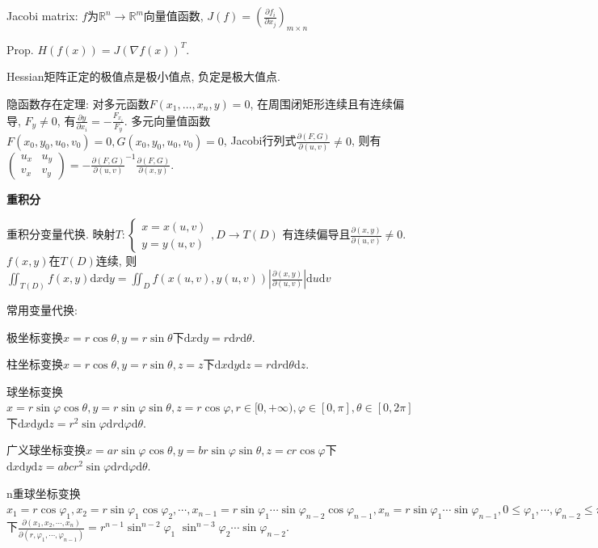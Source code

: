 \documentclass[UTF8]{ctexart}
\begin{document}
Jacobi matrix: $f$为$\mathbb{R}^n\to \mathbb{R}^m$向量值函数,
$J(f)=\left(\frac{\partial f_i}{\partial x_j}\right)_{m\times n}$

Prop. $H(f(x))=J(\nabla f(x))^T$.

Hessian矩阵正定的极值点是极小值点, 负定是极大值点.

隐函数存在定理:
对多元函数$F(x_1,\dots,x_n,y)=0$, 在周围闭矩形连续且有连续偏导, $F_y\neq 0$, 有$\frac{\partial y}{\partial x_i}=-\frac{F_{x_i}}{F_y}$.
多元向量值函数$F(x_0,y_0,u_0,v_0)=0, G(x_0,y_0,u_0,v_0)=0$, Jacobi行列式$\frac{\partial(F,G)}{\partial(u,v)}\neq 0$,
则有$\begin{pmatrix} u_x & u_y \\ v_x  & v_y \end{pmatrix} = -\frac{\partial(F,G)}{\partial(u,v)} ^{-1}\frac{\partial(F,G)}{\partial(x,y)}$.


\noindent \textbf{重积分}

重积分变量代换. 映射$T:
	\left\{\begin{matrix}
		x=x(u,v) \\y=y(u,v)
	\end{matrix}\right.,D\to T(D)$
有连续偏导且$\frac{\partial(x,y)}{\partial(u,v)}\neq 0$.
$f(x,y)$在$T(D)$连续, 则
$\iint_{T(D)}f(x,y)\mathrm{d}x\mathrm{d}y=\iint_{D} f(x(u,v), y(u,v))
	\left|\frac{\partial(x,y)}{\partial(u,v)}\right| \mathrm{d}u\mathrm{d}v$


\noindent 常用变量代换:\par
极坐标变换$x=r\cos\theta,y=r\sin\theta$下$\mathrm{d}x\mathrm{d}y=r\mathrm{d}r\mathrm{d}\theta$.\par
柱坐标变换$x=r\cos\theta,y=r\sin\theta,z=z$下$\mathrm{d}x\mathrm{d}y\mathrm{d}z=r\mathrm{d}r\mathrm{d}\theta\mathrm{d}z$.\par
球坐标变换$x=r\sin\varphi\cos\theta,y=r\sin\varphi\sin\theta,z=r\cos\varphi,
	r\in[0,+\infty),\varphi\in[0,\pi],\theta\in[0,2\pi]$下$\mathrm{d}x\mathrm{d}y\mathrm{d}z
	=r^2\sin\varphi \mathrm{d}r\mathrm{d}\varphi \mathrm{d}\theta$.\par
广义球坐标变换$x=ar\sin\varphi\cos\theta,y=br\sin\varphi\sin\theta,z=cr\cos\varphi$下$\mathrm{d}x\mathrm{d}y\mathrm{d}z
	=abcr^2\sin\varphi \mathrm{d}r\mathrm{d}\varphi \mathrm{d}\theta$.\par
n重球坐标变换$x_{1}=r \cos \varphi_{1}, x_{2}=r \sin \varphi_{1} \cos \varphi_{2}, \cdots,
	x_{n-1}=r \sin \varphi_{1}\cdots \sin \varphi_{n-2} \cos \varphi_{n-1},
	x_{n}=r \sin \varphi_{1}\cdots\sin \varphi_{n-1},
	0\leq \varphi_1,\cdots,\varphi_{n-2}\leq \pi,0\leq \varphi_{n-1}\leq 2\pi$下$
	\frac{\partial\left(x_{1}, x_{2}, \cdots, x_{n}\right)}{\partial\left(r, \varphi_{1}, \cdots, \varphi_{n-1}\right)}=
	r^{n-1} \sin ^{n-2} \varphi_{1}$
$\sin ^{n-3} \varphi_{2} \cdots \sin \varphi_{n-2} $. \\
\end{document}
